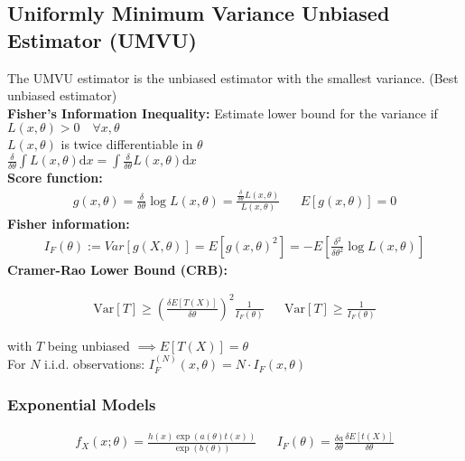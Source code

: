 \begin{mdframed}[style=eqbox]
  \subsection{Uniformly Minimum Variance Unbiased Estimator (UMVU)}
  The UMVU estimator is the unbiased estimator with the smallest variance. (Best unbiased estimator)\\[0.25em]
  \textbf{Fisher's Information Inequality:} Estimate lower bound for the variance if\\
  $ L(x, \theta) > 0 \quad \forall x, \theta$\\[0.25em]
  $ L(x, \theta)$ is twice differentiable in $\theta$\\[0.25em]
  $ \frac{\delta}{\delta \theta} \int L(x, \theta) \text{d}x = \int \frac{\delta}{\delta \theta} L(x, \theta) \text{d}x$\\[0.5em]
  \textbf{Score function:}
  \vspace*{-4pt}
  \begin{align*}
    g(x, \theta) = \frac{\delta}{\delta \theta} \log L(x, \theta) = \frac{\frac{\delta}{\delta \theta} L(x, \theta)}{L(x, \theta)} && E[g(x, \theta)] = 0
  \end{align*}
  \textbf{Fisher information:}
  \vspace*{-4pt}
  \begin{align*}
    I_F(\theta) := Var[g(X, \theta)] = E[g(x, \theta)^2] = -E\left[\frac{\delta^2}{\delta \theta^2} \log L(x, \theta)\right]
  \end{align*}
  \textbf{Cramer-Rao Lower Bound (CRB):}
  \vspace*{-4pt}
  \begin{mdframed}[style=redbox]
    \vspace*{-10pt}
    \begin{align*}
      \text{Var}[T] \geq \left ( \frac{\delta E[T(X)]}{\delta \theta} \right )^2 \frac{1}{I_F(\theta)} && \text{Var}[T] \geq \frac{1}{I_F(\theta)}
    \end{align*}
  \end{mdframed}
  \vspace*{-4pt}\small{with $T$ being unbiased $\implies E[T(X)] = \theta$}\\[0.25em]
  For $N$ i.i.d. observations: $I_F^{(N)}(x, \theta) = N \cdot I_F(x, \theta)$
  \subsubsection{Exponential Models}
  \vspace*{-4pt}
  \begin{align*}
    f_X(x; \theta) = \frac{h(x)\exp(a(\theta)t(x))}{\exp(b(\theta))} && I_F(\theta) = \frac{\delta a}{\delta \theta} \frac{\delta E[t(X)]}{\delta \theta}
  \end{align*}

\end{mdframed}
